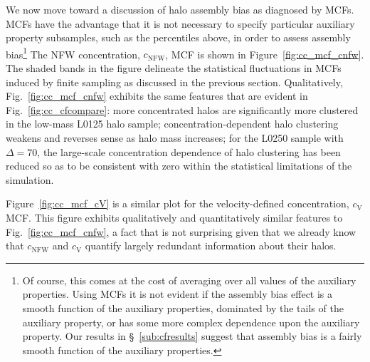 \documentclass[usenatbib,usegraphicx,letterpaper]{mn2e}
\begin{document}
We now move toward a discussion of halo assembly bias as diagnosed by MCFs. 
MCFs have the advantage that it is not necessary 
to specify particular auxiliary property subsamples, such as the percentiles above, 
in order to assess assembly bias\footnote{Of course, this comes at the cost of averaging 
over all values of the auxiliary properties. Using MCFs it is not evident if the assembly bias effect 
is a smooth function of the auxiliary properties, dominated by the tails of the auxiliary property, or 
has some more complex dependence upon the auxiliary property. Our results in \S~\ref{sub:cfresults} suggest 
that assembly bias is a fairly smooth function of the auxiliary properties.} 
The NFW concentration, $c_{\mathrm{NFW}}$, MCF is shown in Figure~\ref{fig:cc_mcf_cnfw}. 
The shaded bands in the figure delineate the statistical fluctuations in MCFs induced by 
finite sampling as discussed in the previous section. Qualitatively, 
Fig.~\ref{fig:cc_mcf_cnfw} exhibits the same features that are evident in 
Fig.~\ref{fig:cc_cfcompare}: more concentrated halos are significantly more clustered in 
the low-mass L0125 halo sample; concentration-dependent halo clustering weakens and 
reverses sense as halo mass increases; for the L0250 sample with $\Delta=70$, the large-scale 
concentration dependence of halo clustering has been reduced so as to be consistent with 
zero within the statistical limitations of the simulation. 


Figure~\ref{fig:cc_mcf_cV} is a similar plot for the velocity-defined concentration, $c_{\mathrm{V}}$ MCF. 
This figure exhibits qualitatively and quantitatively similar features to Fig.~\ref{fig:cc_mcf_cnfw}, a 
fact that is not surprising given that we already know that $c_{\mathrm{NFW}}$ and $c_{\mathrm{V}}$ 
quantify largely redundant information about their halos. 
\end{document}
